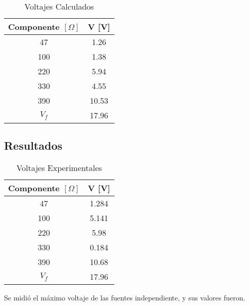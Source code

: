\documentclass{article}
\begin{document}
\begin{table}[h!]
\centering

\begin{tabular}{|c|c|}
\hline
Componente $[\Omega]$& V {[}V{]} \\ \hline
47         &   1.26       \\ \hline
100        & 1.38           \\ \hline
220        & 5.94          \\ \hline
330        &     4.55      \\ \hline
390        &         10.53  \\ \hline
$V_f$        &         17.96  \\ \hline
\end{tabular}

\caption{Voltajes Calculados}
\label{tabla-teoricos}
\end{table}

\subsection{Resultados}


\begin{table}[h!]
\centering

\begin{tabular}{|c|c|}
\hline
Componente $[\Omega]$& V {[}V{]} \\ \hline
47         &   1.284        \\ \hline
100        & 5.141           \\ \hline
220        & 5.98          \\ \hline
330        &     0.184      \\ \hline
390        &         10.68  \\ \hline
$V_f$        &         17.96  \\ \hline
\end{tabular}

\caption{Voltajes Experimentales}
\label{tabla-experimentales}
\end{table}

Se midió el máximo voltaje de las fuentes independiente, y sus valores fueron.\\
\end{document}
